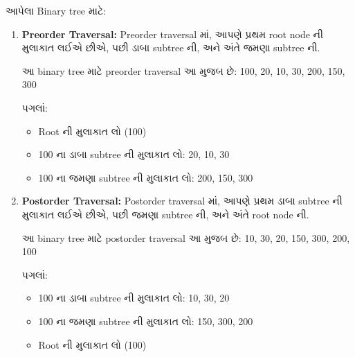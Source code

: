 આપેલા Binary tree માટે:

\begin{Shaded}
\begin{Highlighting}[]
    
\end{Highlighting}
\end{Shaded}

\begin{enumerate}
\def\labelenumi{\arabic{enumi}.}
\item
  \textbf{Preorder Traversal:} Preorder traversal માં, આપણે પ્રથમ root node
  ની મુલાકાત લઈએ છીએ, પછી ડાબા subtree ની, અને અંતે જમણા subtree ની.

  આ binary tree માટે preorder traversal આ મુજબ છે: 100, 20, 10, 30, 200,
  150, 300

  પગલાં:

  \begin{itemize}
  \tightlist
  \item
    Root ની મુલાકાત લો (100)
  \item
    100 ના ડાબા subtree ની મુલાકાત લો: 20, 10, 30
  \item
    100 ના જમણા subtree ની મુલાકાત લો: 200, 150, 300
  \end{itemize}
\item
  \textbf{Postorder Traversal:} Postorder traversal માં, આપણે પ્રથમ ડાબા
  subtree ની મુલાકાત લઈએ છીએ, પછી જમણા subtree ની, અને અંતે root node ની.

  આ binary tree માટે postorder traversal આ મુજબ છે: 10, 30, 20, 150, 300,
  200, 100

  પગલાં:

  \begin{itemize}
  \tightlist
  \item
    100 ના ડાબા subtree ની મુલાકાત લો: 10, 30, 20
  \item
    100 ના જમણા subtree ની મુલાકાત લો: 150, 300, 200
  \item
    Root ની મુલાકાત લો (100)
  \end{itemize}
\end{enumerate}


